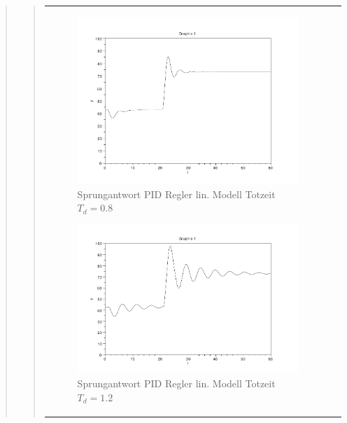 \begin{quote}
\begin{quote}
\begin{center}
\begin{tabular}{ll}
                \hspace{-1cm}
                    \begin{minipage}{0.6\textwidth}
                        \begin{figure}[H]
                            \includegraphics[scale=0.4, trim = 0cm 0cm 0cm
                            0cm, clip]
                            {./Bilder/4_1_Td_08}
                              \caption{Sprungantwort PID Regler lin. Modell Totzeit $T_d = 0.8$}
                        \end{figure}
                    \end{minipage}
                    
                    \begin{minipage}{0.6\textwidth}
                        \begin{figure}[H]
                            \includegraphics[scale=0.4,trim = 0cm 0cm 0cm
                            0cm, clip]
                            {./Bilder/4_1_Td_12}
                              \caption{Sprungantwort PID Regler lin. Modell Totzeit $T_d = 1.2$}
                        \end{figure}
                    \end{minipage}
                

\end{tabular}
\end{center}
\end{quote}
\end{quote}

